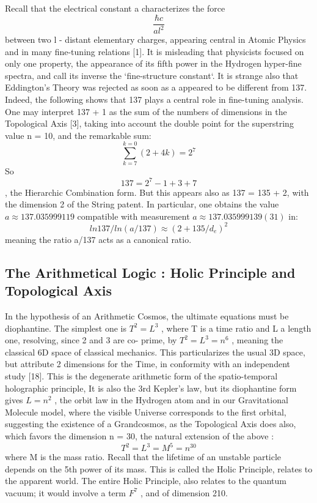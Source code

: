 \documentclass[twoside,draft]{article}
\begin{document}
\begin{sloppypar}
{Recall that the electrical constant a characterizes the force 
\begin{equation}
\frac{\hbar c}{al^{2}}
\end{equation} between two l - distant
elementary charges, appearing central in Atomic Physics and in many fine-tuning relations [1]. It is
misleading that physicists focused on only one property, the appearance of its fifth power in the
Hydrogen hyper-fine spectra, and call its inverse the `fine-structure constant`. It is strange also that
Eddington's Theory was rejected as soon as a appeared to be different from 137. Indeed, the
following shows that 137 plays a central role in fine-tuning analysis. One may interpret 137 + 1 as
the sum of the numbers of dimensions in the Topological Axis [3], taking into account the double
point for the superstring value n = 10, and the remarkable sum:
\begin{equation}
\sum_{k=7}^{k=0}(2 + 4 k ) = 2^{7}
\end{equation}
So 
\begin{equation}
137 = 2^{7} - 1 + 3 + 7
\end{equation}, the Hierarchic Combination form. But this appears also as 137 = 135 + 2,
with the dimension 2 of the String patent. In particular, one obtains the value $a \approx 137.035999119$
compatible with measurement $a \approx 137.035999139(31)$ in:
\begin{equation}
ln137/ln(a/137) \approx (2+135/d_{e})^{2}
\end{equation}
meaning the ratio a/137 acts as a canonical ratio.

\subsection{The Arithmetical Logic : Holic Principle and Topological Axis}

In the hypothesis of an Arithmetic Cosmos, the ultimate equations must be diophantine. The
simplest one is $T^{2} = L^{3}$ , where T is a time ratio and L a length one, resolving, since 2 and 3 are co-
prime, by $T^{2} = L^{3} = n^{6}$ , meaning the classical 6D space of classical mechanics. This particularizes
the usual 3D space, but attribute 2 dimensions for the Time, in conformity with an independent
study [18].
This is the degenerate arithmetic form of the spatio-temporal holographic principle, It is also the
3rd Kepler's law, but its diophantine form gives $L = n^{2}$ , the orbit law in the Hydrogen atom and in our
Gravitational Molecule model, where the visible Universe corresponds to the first orbital,
suggesting the existence of a Grandcosmos, as the Topological Axis does also, which favors the
dimension n = 30, the natural extension of the above :
\begin{equation}
T^{2} = L^{3} = M^{5} = n^{30}
\end{equation}
where M is the mass ratio. Recall that the lifetime of an unstable particle depends on the 5th power of its mass. This is called the Holic Principle, relates to the apparent world. The entire Holic
Principle, also relates to the quantum vacuum; it would involve a term $F^{7}$ , and of dimension 210.

}
\end{sloppypar}
\end{document}
